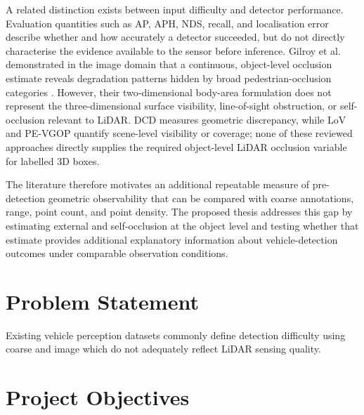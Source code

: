\documentclass[12pt,a4paper]{article}
\begin{document}
A related distinction exists between input difficulty and detector performance. Evaluation quantities such as AP, APH, NDS, recall, and localisation error describe whether and how accurately a detector succeeded, but do not directly characterise the evidence available to the sensor before inference. Gilroy et al. demonstrated in the image domain that a continuous, object-level occlusion estimate reveals degradation patterns hidden by broad pedestrian-occlusion categories \cite{bib_ref_32}. However, their two-dimensional body-area formulation does not represent the three-dimensional surface visibility, line-of-sight obstruction, or self-occlusion relevant to LiDAR. DCD measures geometric discrepancy, while LoV and PE-VGOP quantify scene-level visibility or coverage; none of these reviewed approaches directly supplies the required object-level LiDAR occlusion variable for labelled 3D boxes.

The literature therefore motivates an additional repeatable measure of pre-detection geometric observability that can be compared with coarse annotations, range, point count, and point density. The proposed thesis addresses this gap by estimating external and self-occlusion at the object level and testing whether that estimate provides additional explanatory information about vehicle-detection outcomes under comparable observation conditions.


\section{Problem Statement}

Existing vehicle perception datasets commonly define detection
difficulty using coarse and image which
do not adequately reflect LiDAR sensing quality.

\section{Project Objectives}
\end{document}
